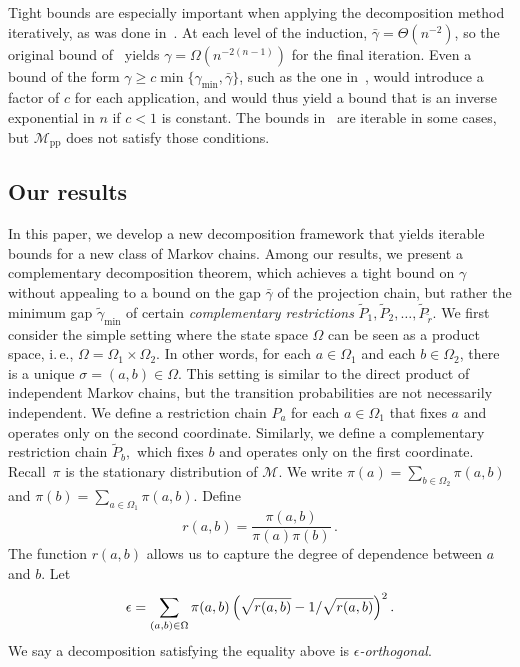 \documentclass[11pt]{article}
\numberwithin{equation}{section}
\theoremstyle{definition}
\theoremstyle{plain}
\newcommand{\ie}{i.\,e.}
\let\TocOriginalLabel\label
\renewcommand{\label}[1]{\ifstrequal{#1}{mono}{\global\advance\TocMonoUses by1 \ifnum\TocMonoUses>3 \PackageError{toc-native-compat}{Unsupported extra mono declaration}{Exactly three unused original declarations are approved.}\fi \ifnum\TocMonoUses=1 \TocOriginalLabel{#1}\fi}{\TocOriginalLabel{#1}}}
\newcommand{\cM}{\mathcal{M}}
\newcommand{\transmat}{P}
\newcommand{\Ptilde}{\tilde{\transmat}}
\newcommand{\gammahat}{\gamma}
\newcommand{\gammatilde}{\tilde{\gamma}}
\newcommand{\gammabar}{\bar{\gamma}}
\newcommand{\numrests}{r}
\newcommand{\rtilde}{\tilde{\numrests}}
\newcommand{\m}{\cM}
\newcommand{\gmin}{\gminhat}
\newcommand{\gminhat}{\gammahat_{\min}}
\newcommand{\gmintilde}{\gammatilde_{\min}}
\newcommand{\mk}{\cM_{\text{pp}}}
\begin{document}
Tight bounds are especially important when applying the decomposition 
method iteratively, as was done in~\cite{MS}. At each level of the 
induction, $\gammabar=\Theta(n^{-2})$, so the original bound 
of~\cite{MR00} yields $\gamma=\Omega(n^{-2(n-1)})$ for the final 
iteration.   Even a bound of the form $\gamma \geq c \min\{\gmin, 
\gammabar\}$, such as the one in~\cite{PS17}, would introduce a factor 
of $c$ for each application, and would thus yield a bound that is an 
inverse exponential in $n$ if $c<1$ is constant. The bounds 
in~\cite{jstv04} are iterable in some cases, but $\mk$ does not satisfy 
those conditions.

\subsection{Our results}

In this paper, we develop a new decomposition framework that yields 
iterable bounds for a new class of Markov chains. Among our results, we 
present a complementary decomposition theorem, which achieves a tight 
bound on $\gamma$ without appealing to a bound on the gap $\gammabar$ 
of the projection chain, but rather the minimum gap $\gmintilde$ of 
certain \emph{complementary restrictions} 
$\Ptilde_1,\Ptilde_2,\ldots,\Ptilde_{\rtilde}$. We first consider the 
simple setting where the state space $\Omega$ can be seen as a product 
space, \ie,  $\Omega=\Omega_1\times\Omega_2$. In other words, for each 
$a\in\Omega_1$ and each $b\in\Omega_2$, there is a unique 
$\sigma=(a,b)\in \Omega$. This setting is similar to the direct product 
of independent Markov chains, but the transition probabilities are not 
necessarily independent. We define a restriction chain $P_a$ for each 
$a\in\Omega_1$ that fixes $a$ and operates only on the second 
coordinate.  Similarly, we define a complementary restriction chain 
$\Ptilde_b,$ which fixes $b$ and operates only on the first coordinate. 
Recall~$\pi$ is the stationary distribution of $\m$. We write $\pi(a) = 
\sum_{b\in \Omega_2}\pi(a,b)$ and $\pi(b) = \sum_{a\in 
\Omega_1}\pi(a,b)$.  Define \[r(a,b) = \frac{\pi(a,b)}{\pi(a)\pi(b)}\,.\] 
The function $r(a,b)$ allows us to capture the degree of dependence 
between $a$ and $b$.  Let
\begin{equation}\label{eq:eps}
\epsilon = \sum_{(a,b)\in\Omega}\pi(a,b)\left(\sqrt{r(a,b)} -
1/\sqrt{r(a,b)}\right)^2.
\end{equation}
We say a decomposition satisfying the equality above is \emph{$\epsilon$-orthogonal}. 
%
%
%
%
%
\end{document}
